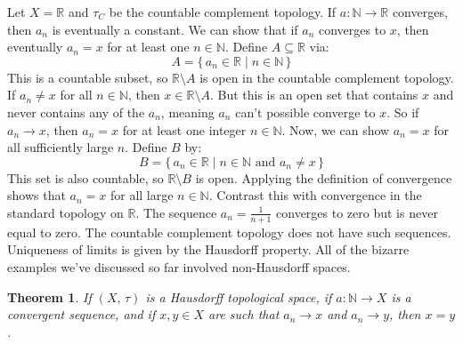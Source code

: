 \documentclass{article}
\theoremstyle{plain}
\newtheorem{theorem}{Theorem}[section]
\theoremstyle{normal}
\newenvironment{example}{%
    \pushQED{\qed}\renewcommand{\qedsymbol}{$\blacksquare$}\examplex%
}{%
    \popQED\endexamplex%
}
\begin{document}
        \begin{example}
            Let $X=\mathbb{R}$ and $\tau_{C}$ be the countable complement
            topology. If $a:\mathbb{N}\rightarrow\mathbb{R}$ converges, then
            $a_{n}$ is eventually a constant. We can show that if
            $a_{n}$ converges to $x$, then eventually $a_{n}=x$ for at least
            one $n\in\mathbb{N}$. Define $A\subseteq\mathbb{R}$ via:
            \begin{equation}
                A=\{\,a_{n}\in\mathbb{R}\;|\;n\in\mathbb{N}\,\}
            \end{equation}
            This is a countable subset, so $\mathbb{R}\setminus{A}$ is open
            in the countable complement topology. If
            $a_{n}\ne{x}$ for all $n\in\mathbb{N}$, then
            $x\in\mathbb{R}\setminus{A}$. But this is an open set that contains
            $x$ and never contains any of the $a_{n}$, meaning $a_{n}$ can't
            possible converge to $x$. So if $a_{n}\rightarrow{x}$, then
            $a_{n}=x$ for at least one integer $n\in\mathbb{N}$. Now, we can
            show $a_{n}=x$ for all sufficiently large $n$. Define $B$ by:
            \begin{equation}
                B=\{\,a_{n}\in\mathbb{R}\;|\;n\in\mathbb{N}
                    \textrm{ and }a_{n}\ne{x}\,\}
            \end{equation}
            This set is also countable, so $\mathbb{R}\setminus{B}$ is open.
            Applying the definition of convergence shows that
            $a_{n}=x$ for all large $n\in\mathbb{N}$. Contrast this with
            convergence in the standard topology on $\mathbb{R}$. The
            sequence $a_{n}=\frac{1}{n+1}$ converges to zero but is never
            equal to zero. The countable complement topology does not have
            such sequences.
        \end{example}
        Uniqueness of limits is given by the Hausdorff property. All of the
        bizarre examples we've discussed so far involved non-Hausdorff spaces.
        \begin{theorem}
            If $(X,\,\tau)$ is a Hausdorff topological space, if
            $a:\mathbb{N}\rightarrow{X}$ is a convergent sequence, and if
            $x,y\in{X}$ are such that $a_{n}\rightarrow{x}$ and
            $a_{n}\rightarrow{y}$, then $x=y$.
        \end{theorem}
\end{document}
